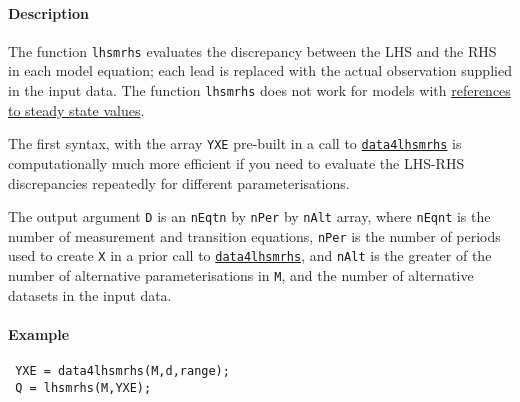  \paragraph{Description}
 
 The function \texttt{lhsmrhs} evaluates the discrepancy between the LHS
 and the RHS in each model equation; each lead is replaced with the
 actual observation supplied in the input data. The function
 \texttt{lhsmrhs} does not work for models with
 \href{modellang/sstateref}{references to steady state values}.
 
 The first syntax, with the array \texttt{YXE} pre-built in a call to
 \href{model/data4lhsmrhs}{\texttt{data4lhsmrhs}} is computationally much
 more efficient if you need to evaluate the LHS-RHS discrepancies
 repeatedly for different parameterisations.
 
 The output argument \texttt{D} is an \texttt{nEqtn} by \texttt{nPer} by
 \texttt{nAlt} array, where \texttt{nEqnt} is the number of measurement
 and transition equations, \texttt{nPer} is the number of periods used to
 create \texttt{X} in a prior call to
 \href{model/data4lhsmrhs}{\texttt{data4lhsmrhs}}, and \texttt{nAlt} is
 the greater of the number of alternative parameterisations in
 \texttt{M}, and the number of alternative datasets in the input data.
 
 \paragraph{Example}
 
 \begin{verbatim}
 YXE = data4lhsmrhs(M,d,range);
 Q = lhsmrhs(M,YXE);
 \end{verbatim}


